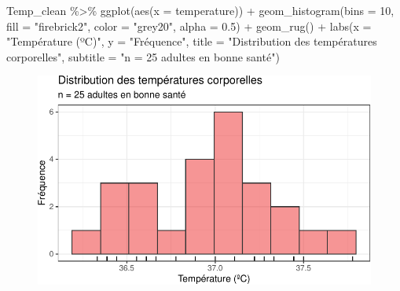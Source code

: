 \documentclass[
  a4paper,
  DIV=11,
  numbers=noendperiod,
  oneside]{scrreprt}
\newenvironment{Shaded}{}{}
\newcommand{\AttributeTok}[1]{\textcolor[rgb]{0.84,0.23,0.29}{#1}}
\newcommand{\DecValTok}[1]{\textcolor[rgb]{0.00,0.36,0.77}{#1}}
\newcommand{\FloatTok}[1]{\textcolor[rgb]{0.00,0.36,0.77}{#1}}
\newcommand{\FunctionTok}[1]{\textcolor[rgb]{0.44,0.26,0.76}{#1}}
\newcommand{\NormalTok}[1]{\textcolor[rgb]{0.14,0.16,0.18}{#1}}
\newcommand{\SpecialCharTok}[1]{\textcolor[rgb]{0.00,0.36,0.77}{#1}}
\newcommand{\StringTok}[1]{\textcolor[rgb]{0.01,0.18,0.38}{#1}}
\begin{document}
\begin{Shaded}
\begin{Highlighting}[]
\NormalTok{Temp\_clean }\SpecialCharTok{\%\textgreater{}\%}
  \FunctionTok{ggplot}\NormalTok{(}\FunctionTok{aes}\NormalTok{(}\AttributeTok{x =}\NormalTok{ temperature)) }\SpecialCharTok{+}
  \FunctionTok{geom\_histogram}\NormalTok{(}\AttributeTok{bins =} \DecValTok{10}\NormalTok{, }\AttributeTok{fill =} \StringTok{"firebrick2"}\NormalTok{, }\AttributeTok{color =} \StringTok{"grey20"}\NormalTok{, }
                 \AttributeTok{alpha =} \FloatTok{0.5}\NormalTok{) }\SpecialCharTok{+}
  \FunctionTok{geom\_rug}\NormalTok{() }\SpecialCharTok{+}
  \FunctionTok{labs}\NormalTok{(}\AttributeTok{x =} \StringTok{"Température (ºC)"}\NormalTok{,}
       \AttributeTok{y =} \StringTok{"Fréquence"}\NormalTok{,}
       \AttributeTok{title =} \StringTok{"Distribution des températures corporelles"}\NormalTok{,}
       \AttributeTok{subtitle =} \StringTok{"n = 25 adultes en bonne santé"}\NormalTok{)}
\end{Highlighting}
\end{Shaded}

\begin{figure}[H]

{\centering \includegraphics{01-OneSampleTests_files/figure-pdf/unnamed-chunk-14-1.pdf}

}

\end{figure}
\end{document}

